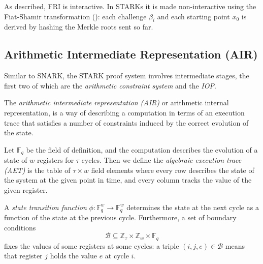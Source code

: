 \documentclass[../../book]{subfiles}
\begin{document}
\begin{remark}
  As described, FRI is interactive. In STARKs it is made non-interactive using the Fiat-Shamir
  transformation (): each challenge $\beta_i$ and each starting point $x_0$
  is derived by hashing the Merkle roots sent so far.
\end{remark}

\subsection{Arithmetic Intermediate Representation (AIR)}\label{subsec:air}
Similar to SNARK, the STARK proof system involves intermediate stages, the first two of which are the \emph{arithmetic constraint system} and the \emph{IOP}.

\begin{definition}\label{def:air}
  The \emph{arithmetic intermediate representation (AIR)} or arithmetic internal representation, is a way of describing a computation in terms of an execution trace that satisfies a number of constraints induced by the correct evolution of the state.
\end{definition}

\begin{definition}\label{def:aet}
  Let $\mathbb{F}_q$ be the field of definition, and the computation describes the evolution of a state of $w$ registers for $\tau$ cycles. Then we define the \emph{algebraic execution trace (AET)} is the table of $\tau \times w$ field elements where every row describes the state of the system at the given point in time, and every column tracks the value of the given register.
\end{definition}

\begin{definition}\label{def:st-function}
  A \emph{state transition function} $\phi:\mathbb{F}_q^{w}\rightarrow\mathbb{F}_q^{w}$ determines the state at the next cycle as a function of the state at the previous cycle. Furthermore, a set of boundary conditions 
  \begin{equation*}
    \mathcal{B}\subseteq \mathbb{Z}_\tau \times\mathbb{Z}_w\times\mathbb{F}_q
  \end{equation*}
  fixes the values of some registers at some cycles: a triple $(i,j,e) \in \mathcal{B}$ means that register $j$ holds the value $e$ at cycle $i$.
\end{definition}
\end{document}

